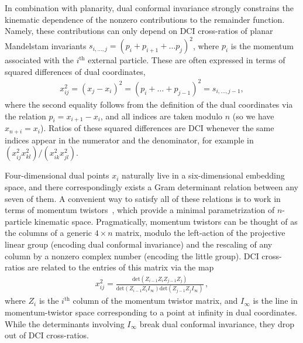 \documentclass[11pt]{article}
\begin{document}
In combination with planarity, dual conformal invariance strongly constrains the kinematic dependence of the nonzero contributions to the remainder function. Namely, these contributions can only depend on DCI cross-ratios of planar Mandelstam invariants $s_{i,\dots,j} = (p_i + p_{i+1} + \dots p_{j})^2$, where $p_i$ is the momentum associated with the $i^{\text{th}}$ external particle. These are often expressed in terms of squared differences of dual coordinates, 
\begin{align}
x_{ij}^2 = (x_j - x_i)^2 = (p_i+ \dots + p_{j-1})^2 = s_{i,\dots,j-1},
\end{align}
where the second equality follows from the definition of the dual coordinates via the relation $p_i = x_{i+1} - x_i$, and all indices are taken modulo $n$ (so we have $x_{n+i} = x_i$). Ratios of these squared differences are DCI whenever the same indices appear in the numerator and the denominator, for example in $(x_{ij}^2 x_{kl}^2)/(x_{ik}^2 x_{jl}^2)$.  

Four-dimensional dual points $x_i$ naturally live in a six-dimensional embedding space, and there correspondingly exists a Gram determinant relation between any seven of them. A convenient way to satisfy all of these relations is to work in terms of momentum twistors~\cite{Hodges:2009hk}, which provide a minimal parametrization of $n$-particle kinematic space. Pragmatically, momentum twistors can be thought of as the columns of a generic $4\! \times \! n$ matrix, modulo the left-action of the projective linear group (encoding dual conformal invariance) and the rescaling of any column by a nonzero complex number (encoding the little group). DCI cross-ratios are related to the entries of this matrix via the map
\begin{align}
x_{ij}^2 = \frac{\text{det}(Z_{i-1} Z_i Z_{j-1} Z_j)}{\text{det}(Z_{i-1} Z_i I_\infty) \text{det}(Z_{j-1} Z_j I_\infty)}  \, ,
\end{align} 
where $Z_i$ is the $i^\text{th}$ column of the momentum twistor matrix, and $I_\infty$ is the line in momentum-twistor space corresponding to a point at infinity in dual coordinates. While the determinants involving $I_\infty$ break dual conformal invariance, they drop out of DCI cross-ratios. 
\end{document}
